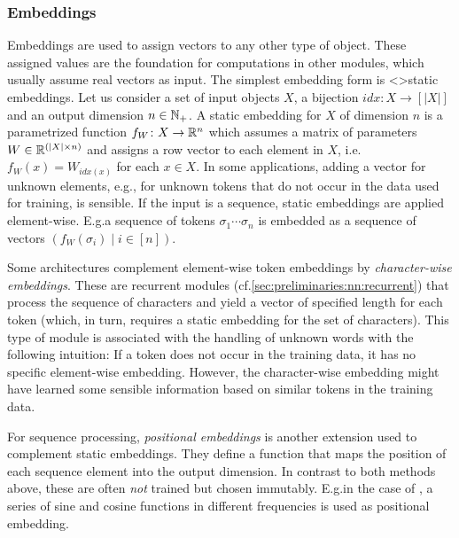 \documentclass[../document.tex]{subfiles}
\begin{document}
    \subsubsection{Embeddings}
    Embeddings are used to assign vectors to any other type of object.
    These assigned values are the foundation for computations in other modules, which usually assume real vectors as input.
    The simplest embedding form is <>{static embeddings}.
    Let us consider a set of input objects \(X\), a bijection \(\mathit{idx}\colon X \to [|X|]\) and an output dimension \(n \in \mathbb{N}_+\).
    A static embedding for \(X\) of dimension \(n\) is a parametrized function \(f_W\colon X \to \mathbb{R}^n\) which assumes a matrix of parameters \(W \in \mathbb{R}^{(|X| \times n)}\) and assigns a row vector to each element in \(X\), i.e.\@ \(f_W(x) = W_{\mathit{idx}(x)}\) for each \(x \in X\).
    In some applications, adding a vector for unknown elements, e.g.\@, for unknown tokens that do not occur in the data used for training, is sensible.
    If the input is a sequence, static embeddings are applied element-wise.
    E.g.\@ a sequence of tokens \(\sigma_1 \cdots \sigma_n\) is embedded as a sequence of vectors \((f_W(\sigma_i) \mid i \in [n])\).

    Some architectures complement element-wise token embeddings by \emph{character-wise embeddings}. \citep[e.g.\@]{kiperwasser2016simple,Akb18}
    These are recurrent modules (cf.\@ \cref{sec:preliminaries:nn:recurrent}) that process the sequence of characters and yield a vector of specified length for each token (which, in turn, requires a static embedding for the set of characters).
    This type of module is associated with the handling of unknown words with the following intuition:
        If a token does not occur in the training data, it has no specific element-wise embedding.
        However, the character-wise embedding might have learned some sensible information based on similar tokens in the training data.

    For sequence processing, \emph{positional embeddings} is another extension used to complement static embeddings.
    They define a function that maps the position of each sequence element into the output dimension.
    In contrast to both methods above, these are often \emph{not} trained but chosen immutably.
    E.g.\@ in the case of , a series of sine and cosine functions in different frequencies is used as positional embedding.

\end{document}
